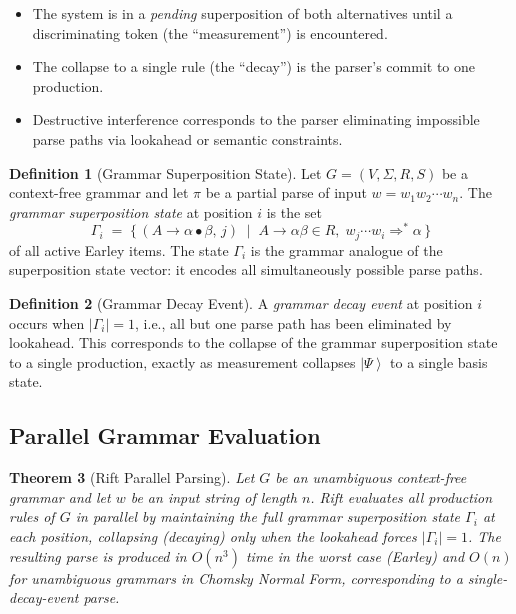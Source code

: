 \documentclass[11pt]{article}
\theoremstyle{plain}
\newtheorem{theorem}{Theorem}[section]
\theoremstyle{definition}
\newtheorem{definition}[theorem]{Definition}
\theoremstyle{remark}
\newcommand{\ket}[1]{\left| #1 \right\rangle}
\begin{document}
\begin{itemize}
  \item The system is in a \emph{pending} superposition of both alternatives
        until a discriminating token (the ``measurement'') is encountered.
  \item The collapse to a single rule (the ``decay'') is the parser's commit
        to one production.
  \item Destructive interference corresponds to the parser eliminating
        impossible parse paths via lookahead or semantic constraints.
\end{itemize}

\begin{definition}[Grammar Superposition State]
  Let $G = (V, \Sigma, R, S)$ be a context-free grammar and let $\pi$ be a
  partial parse of input $w = w_1 w_2 \cdots w_n$.  The \emph{grammar
  superposition state} at position $i$ is the set
  \[
    \Gamma_i \;=\; \bigl\{\, (A \to \alpha \bullet \beta,\, j)
                   \;\mid\; A \to \alpha\beta \in R,\;
                   w_j \cdots w_i \Rightarrow^* \alpha \,\bigr\}
  \]
  of all active Earley items.  The state $\Gamma_i$ is the grammar analogue
  of the superposition state vector: it encodes all simultaneously possible
  parse paths.
\end{definition}

\begin{definition}[Grammar Decay Event]
  A \emph{grammar decay event} at position $i$ occurs when
  $|\Gamma_i| = 1$, i.e., all but one parse path has been eliminated by
  lookahead.  This corresponds to the collapse of the grammar superposition
  state to a single production, exactly as measurement collapses
  $\ket{\Psi}$ to a single basis state.
\end{definition}

\subsection{Parallel Grammar Evaluation}

\begin{theorem}[Rift Parallel Parsing]
  \label{thm:rift}
  Let $G$ be an unambiguous context-free grammar and let $w$ be an input
  string of length $n$.  Rift evaluates all production rules of $G$ in
  \emph{parallel} by maintaining the full grammar superposition state
  $\Gamma_i$ at each position, collapsing (decaying) only when the
  lookahead forces $|\Gamma_i| = 1$.  The resulting parse is produced in
  $O(n^3)$ time in the worst case (Earley) and $O(n)$ for unambiguous
  grammars in Chomsky Normal Form, corresponding to a single-decay-event
  parse.
\end{theorem}
\end{document}
